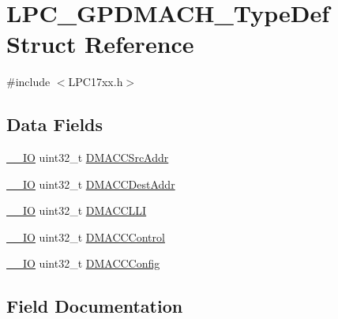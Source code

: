 \hypertarget{structLPC__GPDMACH__TypeDef}{}\section{L\+P\+C\+\_\+\+G\+P\+D\+M\+A\+C\+H\+\_\+\+Type\+Def Struct Reference}
\label{structLPC__GPDMACH__TypeDef}


{\ttfamily \#include $<$L\+P\+C17xx.\+h$>$}

\subsection*{Data Fields}
\begin{DoxyCompactItemize}
\item 
\hyperlink{LPC17xx_8h_aec43007d9998a0a0e01faede4133d6be}{\+\_\+\+\_\+\+IO} uint32\+\_\+t \hyperlink{structLPC__GPDMACH__TypeDef_a6b0842b5ab5e43501d684f874cd5ad79}{D\+M\+A\+C\+C\+Src\+Addr}
\item 
\hyperlink{LPC17xx_8h_aec43007d9998a0a0e01faede4133d6be}{\+\_\+\+\_\+\+IO} uint32\+\_\+t \hyperlink{structLPC__GPDMACH__TypeDef_aba94af16ce1285f05c7045f29987fd30}{D\+M\+A\+C\+C\+Dest\+Addr}
\item 
\hyperlink{LPC17xx_8h_aec43007d9998a0a0e01faede4133d6be}{\+\_\+\+\_\+\+IO} uint32\+\_\+t \hyperlink{structLPC__GPDMACH__TypeDef_abeb9b41622d5ef0b5be547eddae122ff}{D\+M\+A\+C\+C\+L\+LI}
\item 
\hyperlink{LPC17xx_8h_aec43007d9998a0a0e01faede4133d6be}{\+\_\+\+\_\+\+IO} uint32\+\_\+t \hyperlink{structLPC__GPDMACH__TypeDef_a419bf2ba47ac187f8ba16b2294675783}{D\+M\+A\+C\+C\+Control}
\item 
\hyperlink{LPC17xx_8h_aec43007d9998a0a0e01faede4133d6be}{\+\_\+\+\_\+\+IO} uint32\+\_\+t \hyperlink{structLPC__GPDMACH__TypeDef_a6775b0feebee7bb90a05bb649c331c9d}{D\+M\+A\+C\+C\+Config}
\end{DoxyCompactItemize}


\subsection{Field Documentation}
